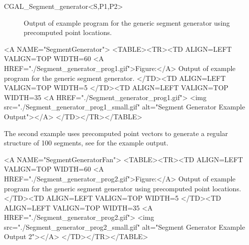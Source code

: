 \begin{ccClassTemplate}{CGAL_Segment_generator<S,P1,P2>}
\begin{ccTexOnly}
  \begin{figure}
    \noindent
    \hspace*{0.025\textwidth}%
    \begin{minipage}{0.45\textwidth}%
      \caption{Output of example program for the generic segment generator.}
      \label{figureSegmentGenerator}
    \end{minipage}%
    \hspace*{0.05\textwidth}%
    \begin{minipage}{0.45\textwidth}%
      \caption{Output of example program for the generic segment
        generator using precomputed point locations.}
      \label{figureSegmentGeneratorFan}
    \end{minipage}%
  \end{figure}
\end{ccTexOnly}


\begin{ccHtmlOnly}
  <A NAME="SegmentGenerator">
  <TABLE><TR><TD ALIGN=LEFT VALIGN=TOP WIDTH=60%
    <A HREF="./Segment_generator_prog1.gif">Figure:</A>
    Output of example program for the generic segment generator.
  </TD><TD ALIGN=LEFT VALIGN=TOP WIDTH=5%
  </TD><TD ALIGN=LEFT VALIGN=TOP WIDTH=35%
    <A HREF="./Segment_generator_prog1.gif">
        <img src="./Segment_generator_prog1_small.gif" 
             alt="Segment Generator Example Output"></A>
  </TD></TR></TABLE>
\end{ccHtmlOnly}

The second example uses precomputed point vectors to generate a
regular structure of 100 segments, see 
 for the example
output.


\begin{ccHtmlOnly}
  <A NAME="SegmentGeneratorFan">
  <TABLE><TR><TD ALIGN=LEFT VALIGN=TOP WIDTH=60%
    <A HREF="./Segment_generator_prog2.gif">Figure:</A>
    Output of example program for the generic segment generator using
    precomputed point locations.
  </TD><TD ALIGN=LEFT VALIGN=TOP WIDTH=5%
  </TD><TD ALIGN=LEFT VALIGN=TOP WIDTH=35%
    <A HREF="./Segment_generator_prog2.gif">
        <img src="./Segment_generator_prog2_small.gif" 
             alt="Segment Generator Example Output 2"></A>
  </TD></TR></TABLE>
\end{ccHtmlOnly}

\end{ccClassTemplate}

\beforecprogskip\parskip
{}

